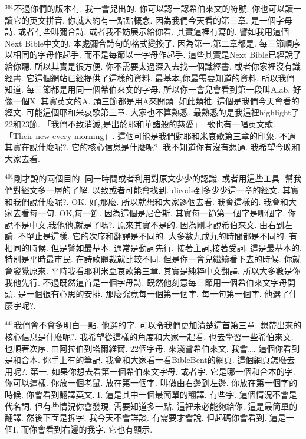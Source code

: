 \documentclass{book}
\begin{document}
$^{361}$不過你們的版本有.
我一會兒出的.
你可以認一認希伯來文的符號.
你也可以讀一讀它的英文拼音.
你就大約有一點點概念.
因為我們今天看的第三章.
是一個字母詩.
或者有些叫彌合詩.
或者我不妨展示給你看.
其實這裡有寫的.
譬如我用這個Next Bible中文的.
本處彌合詩句的格式變換了.
因為第一,第二章都是.
每三節順序以相同的字母作起手.
而不是每節以一字母作起手.
這些其實是Next Bible已經說了給你聽.
所以其實是很方便.
你不需要太過深入去找一個識經書.
或者你家裡沒有識經書.
它這個網站已經提供了這樣的資料.
最基本,你最需要知道的資料.
所以我們知道.
每三節都是用同一個希伯來文的字母.
所以你一會兒會看到第一段叫Alab.
好像一個X.
其實英文的A.
頭三節都是用A來開頭.
如此類推.
這個是我們今天會看的經文.
可能這個耶和米哀歌第三章.
大家也不算熟悉.
最熟悉的是我這裡highlight了22和23節.
「我們不致消滅,是出於耶和華諸般的慈愛」.
歌也有一唱英文歌.
「Their new every morning」.
這個可能是我們對耶和米哀歌第三章的印象.
不過其實在說什麼呢?.
它的核心信息是什麼呢?.
我不知道你有沒有想過.
我希望今晚和大家去看.

$^{401}$剛才說的兩個目的.
同一時間或者利用對原文少少的認識.
或者用這些工具.
幫我們對經文多一層的了解.
以致或者可能會找到.
dicode到多少少這一章的經文.
其實和我們說什麼呢?.
OK.
好,那麼.
所以就想和大家逐個去看.
我會這樣的.
我會和大家去看每一句.
OK,每一節.
因為這個是尼合斯.
其實每一節第一個字是哪個字.
你說不是中文,我他他,就是了嗎?.
原來其實不是的.
因為剛才說希伯來文.
由右到左讀.
不單止是這樣.
它的次序和翻譯是不同的.
大多數九成九的時間都是不同的.
有相同的時候.
但是譬如最基本.
通常是動詞先行.
接著主詞,接著受詞.
這是最基本的.
特別是平時最市民.
在詩歌體裁就比較不同.
但是你一會兒繼續看下去的時候.
你就會發覺原來.
平時我看耶利米亞哀歌第三章.
其實是純粹中文翻譯.
所以大多數是你我他先行.
不過既然這首是一個字母詩.
既然他刻意每三節用一個希伯來文字母開頭.
是一個很有心思的安排.
那麼究竟每一個第一個字.
每一句第一個字.
他選了什麼字呢?.

$^{441}$我們會不會多明白一點.
他選的字.
可以令我們更加清楚這首第三章.
想帶出來的核心信息是什麼呢?.
我希望從這樣的角度和大家一起看.
也去學習一些希伯來文.
也順著次序.
由阿拉伯到塔爾維爾.
22個字母.
來淺嘗希伯來文.
我會….
這個你看到是和合本.
你手上有的筆記.
我會和大家看一看BibleBent的網頁.
這個網頁怎麼去用呢?.
第一.
如果你想去看第一個希伯來文字母.
或者字.
它是哪一個和合本的字.
你可以這樣.
你放一個老鼠.
放在第一個字.
叫做由右邊到左邊.
你放在第一個字的時候.
你會看到翻譯英文.
I.
這是其中一個最簡單的翻譯.
有些字.
這個情況不會是代名詞.
但有些情況你會發現.
需要知道多一點.
這裡未必能夠給你.
這是最簡單的翻譯.
然後下面是拆字.
我今天不會詳談.
有需要才會說.
但起碼你會看到.
這是一個I.
而你會看到右邊的我字.
它也有顯示.
\end{document}
